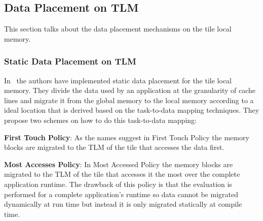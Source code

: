\documentclass{listhesis}
\begin{document}
\subsection{Data Placement on TLM}
This section talks about the data placement mechanisms on the tile local memory.
\subsubsection{Static Data Placement on TLM}
In~\cite{lispaper} the authors have implemented static data placement for the tile local memory. They divide the data used by an application at the granularity of cache lines and migrate it from the global memory to the local memory according to a ideal location that is derived based on the task-to-data mapping techniques. They propose two schemes on how to do this task-to-data mapping:
\par
\textbf{First Touch Policy}: As the names suggest in First Touch Policy the memory blocks are migrated to the TLM of the tile that accesses the data first. 
\par
\textbf{Most Accesses Policy}: In Most Accessed Policy the memory blocks are migrated to the TLM of the tile that accesses it the most over the complete application runtime. The drawback of this policy is that the evaluation is performed for a complete application's runtime so data cannot be migrated dynamically at run time but instead it is only migrated statically at compile time.
\end{document}
